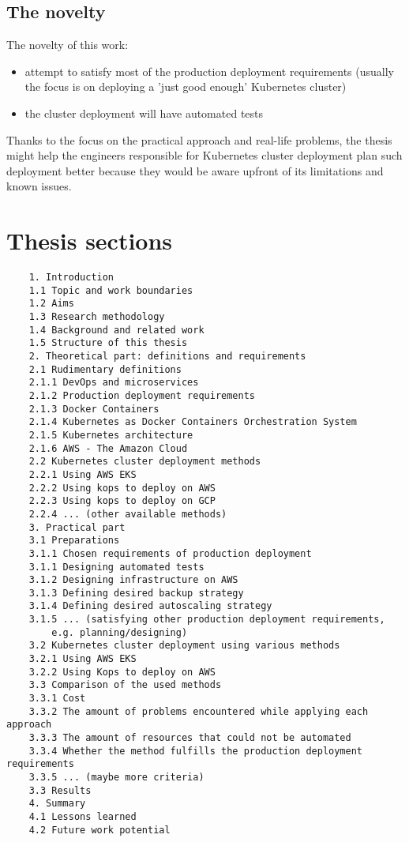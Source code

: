 \documentclass[12pt]{article}
\begin{document}
\subsection{The novelty}

The novelty of this work:
\begin{itemize}
    \item attempt to satisfy most of the production deployment requirements (usually the focus is on deploying a 'just good enough' Kubernetes cluster)
    \item the cluster deployment will have automated tests
\end{itemize}

Thanks to the focus on the practical approach and real-life problems, the thesis might help the engineers responsible for Kubernetes cluster deployment plan such deployment better because they would be aware upfront of its limitations and known issues.


\section{Thesis sections}

\begin{lstlisting}
    1. Introduction
    1.1 Topic and work boundaries
    1.2 Aims
    1.3 Research methodology
    1.4 Background and related work
    1.5 Structure of this thesis
    2. Theoretical part: definitions and requirements
    2.1 Rudimentary definitions
    2.1.1 DevOps and microservices
    2.1.2 Production deployment requirements
    2.1.3 Docker Containers
    2.1.4 Kubernetes as Docker Containers Orchestration System
    2.1.5 Kubernetes architecture
    2.1.6 AWS - The Amazon Cloud
    2.2 Kubernetes cluster deployment methods
    2.2.1 Using AWS EKS
    2.2.2 Using kops to deploy on AWS
    2.2.3 Using kops to deploy on GCP 
    2.2.4 ... (other available methods)
    3. Practical part
    3.1 Preparations
    3.1.1 Chosen requirements of production deployment
    3.1.1 Designing automated tests
    3.1.2 Designing infrastructure on AWS
    3.1.3 Defining desired backup strategy
    3.1.4 Defining desired autoscaling strategy
    3.1.5 ... (satisfying other production deployment requirements,
        e.g. planning/designing)
    3.2 Kubernetes cluster deployment using various methods
    3.2.1 Using AWS EKS
    3.2.2 Using Kops to deploy on AWS
    3.3 Comparison of the used methods
    3.3.1 Cost
    3.3.2 The amount of problems encountered while applying each approach
    3.3.3 The amount of resources that could not be automated
    3.3.4 Whether the method fulfills the production deployment requirements
    3.3.5 ... (maybe more criteria)
    3.3 Results
    4. Summary
    4.1 Lessons learned
    4.2 Future work potential    
\end{lstlisting}
\end{document}
